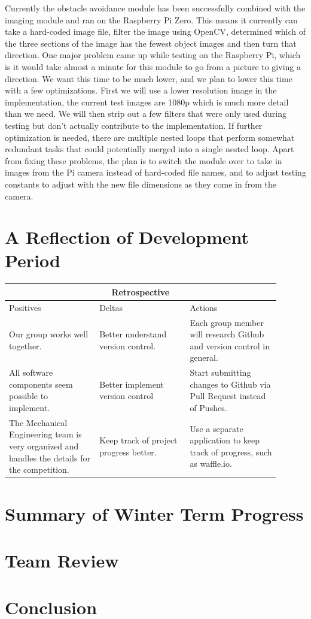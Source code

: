 \documentclass[10pt,letterpaper,onecolumn,draftclsnofoot,journal]{IEEEtran}
\begin{document}
\par
Currently the obstacle avoidance module has been successfully combined with the imaging module and ran on the Raspberry Pi Zero. This means it currently can take a hard-coded image file, filter the image using OpenCV, determined which of the three sections of the image has the fewest object images and then turn that direction. One major problem came up while testing on the Raspberry Pi, which is it would take almost a minute for this module to go from a picture to giving a direction. We want this time to be much lower, and we plan to lower this time with a few optimizations. First we will use a lower resolution image in the implementation, the current test images are 1080p which is much more detail than we need. We will then strip out a few filters that were only used during testing but don't actually contribute to the implementation. If further optimization is needed, there are multiple nested loops that perform somewhat redundant tasks that could potentially merged into a single nested loop. Apart from fixing these problems, the plan is to switch the module over to take in images from the Pi camera instead of hard-coded file names, and to adjust testing constants to adjust with the new file dimensions as they come in from the camera.

\section{A Reflection of Development Period}
\begin{tabular}{ |p{0.3\linewidth}|p{0.3\linewidth}|p{0.3\linewidth}|  }
	\hline
	\multicolumn{3}{|c|}{Retrospective} \\
	\hline
	Positives& Deltas &Actions \\
	\hline
	Our group works well together. &
	Better understand version control.&
	Each group member will research Github and version control in general. \\
	
	All software components seem possible to implement. &
	Better implement version control &
	Start submitting changes to Github via Pull Request instead of Pushes. \\
	
	The Mechanical Engineering team is very organized and handles the details for the competition. &
	Keep track of project progress better. & Use a separate application to keep track of progress, such as waffle.io.  \\
	\hline
\end{tabular}

\section{Summary of Winter Term Progress}

\section{Team Review}

\section{Conclusion}

\clearpage

\vspace{1in}
\end{document}
